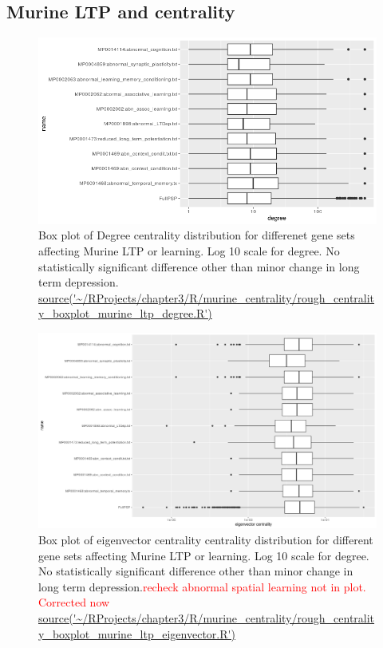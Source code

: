 \subsection{Murine LTP and centrality}
\begin{figure}
    \centering
    \includegraphics[width=\textwidth]{images/chapter3/ggplot2/murine_centrality_boxplot/Rplot_degree_centrality_rough.png}
    \caption{Box plot of Degree centrality distribution for differenet gene sets affecting Murine LTP or learning. Log 10 scale for degree. No statistically significant difference other than minor change in long term depression. \url{source('~/RProjects/chapter3/R/murine_centrality/rough_centrality_boxplot_murine_ltp_degree.R')}}
    \label{fig:murine_ltp_centrality_boxplot_degree}
\end{figure}

\begin{figure}
    \centering
    \includegraphics[width=\textwidth]{images/chapter3/ggplot2/murine_centrality_boxplot/Rplot_eigenvector_rough_corrected.png}
    \caption{Box plot of eigenvector centrality centrality distribution for different gene sets affecting Murine LTP or learning. Log 10 scale for degree. No statistically significant difference other than minor change in long term depression.\textcolor{red}{recheck abnormal spatial learning not in plot. Corrected now} \url{source('~/RProjects/chapter3/R/murine_centrality/rough_centrality_boxplot_murine_ltp_eigenvector.R')}}
    \label{fig:murine_ltp_centrality_boxplot_eigenvector}
\end{figure}

